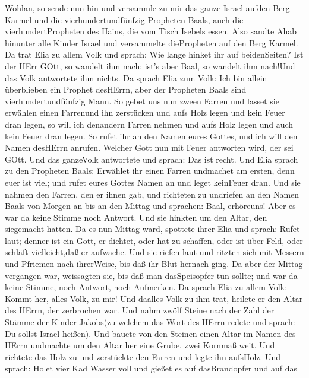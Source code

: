  Wohlan, so sende nun hin und versammle zu mir das ganze
Israel aufden Berg Karmel und die vierhundertundfünfzig Propheten Baals,
auch die vierhundertPropheten des Hains, die vom Tisch Isebels essen.
 Also sandte Ahab hinunter alle Kinder Israel und
versammelte diePropheten auf den Berg Karmel.  Da trat Elia
zu allem Volk und sprach: Wie lange hinket ihr auf beidenSeiten? Ist der
HErr GOtt, so wandelt ihm nach; ist's aber Baal, so wandelt ihm nach!Und
das Volk antwortete ihm nichts.  Da sprach Elia zum Volk:
Ich bin allein überblieben ein Prophet desHErrn, aber der Propheten
Baals sind vierhundertundfünfzig Mann.  So gebet uns nun
zween Farren und lasset sie erwählen einen Farrenund ihn zerstücken und
aufs Holz legen und kein Feuer dran legen, so will ich denandern Farren
nehmen und aufs Holz legen und auch kein Feuer dran legen. 
So rufet ihr an den Namen eures Gottes, und ich will den Namen desHErrn
anrufen. Welcher Gott nun mit Feuer antworten wird, der sei GOtt. Und
das ganzeVolk antwortete und sprach: Das ist recht.  Und
Elia sprach zu den Propheten Baals: Erwählet ihr einen Farren undmachet
am ersten, denn euer ist viel; und rufet eures Gottes Namen an und leget
keinFeuer dran.  Und sie nahmen den Farren, den er ihnen
gab, und richteten zu undriefen an den Namen Baals von Morgen an bis an
den Mittag und sprachen: Baal, erhöreuns! Aber es war da keine Stimme
noch Antwort. Und sie hinkten um den Altar, den siegemacht hatten.
 Da es nun Mittag ward, spottete ihrer Elia und sprach:
Rufet laut; denner ist ein Gott, er dichtet, oder hat zu schaffen, oder
ist über Feld, oder schläft vielleicht,daß er aufwache. 
Und sie riefen laut und ritzten sich mit Messern und Pfriemen nach
ihrerWeise, bis daß ihr Blut hernach ging.  Da aber der
Mittag vergangen war, weissagten sie, bis daß man dasSpeisopfer tun
sollte; und war da keine Stimme, noch Antwort, noch Aufmerken.
 Da sprach Elia zu allem Volk: Kommt her, alles Volk, zu
mir! Und daalles Volk zu ihm trat, heilete er den Altar des HErrn, der
zerbrochen war.  Und nahm zwölf Steine nach der Zahl der
Stämme der Kinder Jakobs(zu welchem das Wort des HErrn redete und
sprach: Du sollst Israel heißen).  Und bauete von den
Steinen einen Altar im Namen des HErrn undmachte um den Altar her eine
Grube, zwei Kornmaß weit.  Und richtete das Holz zu und
zerstückte den Farren und legte ihn aufsHolz.  Und sprach:
Holet vier Kad Wasser voll und gießet es auf dasBrandopfer und auf das
